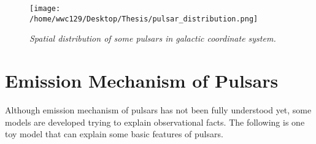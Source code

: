 \documentclass[12pt]{report}
\begin{document}
        \begin{figure}[h]
          \centering
          \texttt{[image: /home/wwc129/Desktop/Thesis/pulsar\_distribution.png]}
          \caption{\textit{\footnotesize Spatial distribution of some pulsars in galactic coordinate system.}}
          \label{fig:spatial distribution}
        \end{figure}
        


        \iffalse 
        \indent Although the primary focuses of this thesis are observational characteristics such as 
        spectra and light-curves, it is helpful to talk a little about internal structure of pulsars.
        \fi 

        \iffalse
        \indent Many stars are in binary systems so neutron stars can also be isolated or in binary systems. 
        Some of them even have planets. That a pulsar is in binary system provides us a convenient way to 
        measure its mass. 
        \indent 
        \fi
		     
    
             


    \section{Emission Mechanism of Pulsars}
            Although emission mechanism of pulsars has not been fully understood yet, some models are developed 
            trying to 
            explain observational facts. The following is one toy model that can explain some basic features of 
            pulsars.
       
\end{document}
